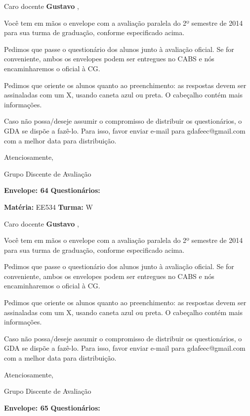 \documentclass[a5paper]{letter}
\begin{document}
Caro docente {\bf Gustavo }, 

	Você tem em mãos o envelope com a avaliação paralela do 2º semestre de 2014 para sua turma de graduação, conforme especificado acima.

	Pedimos que passe o questionário dos alunos junto à avaliação oficial. Se for conveniente, ambos os envelopes podem ser entregues no CABS e nós encaminharemos o oficial à CG.

Pedimos que oriente os alunos quanto ao preenchimento: as respostas devem ser assinaladas com um X, usando caneta azul ou preta. O cabeçalho contém mais informações.

	Caso não possa/deseje assumir o compromisso de distribuir os questionários, o GDA se dispõe a fazê-lo. Para isso, favor enviar e-mail para gdafeec@gmail.com com a melhor data para distribuição.


Atenciosamente, 

Grupo Discente de Avaliação

\vspace{0.5cm}

{\bf Envelope: 64 }		\hfill	{\bf Questionários:} \hspace{2cm}

\newpage
\thispagestyle{empty}

\hfill {\bf Matéria:} EE534 {\bf Turma:} W

Caro docente {\bf Gustavo }, 

	Você tem em mãos o envelope com a avaliação paralela do 2º semestre de 2014 para sua turma de graduação, conforme especificado acima.

	Pedimos que passe o questionário dos alunos junto à avaliação oficial. Se for conveniente, ambos os envelopes podem ser entregues no CABS e nós encaminharemos o oficial à CG.

Pedimos que oriente os alunos quanto ao preenchimento: as respostas devem ser assinaladas com um X, usando caneta azul ou preta. O cabeçalho contém mais informações.

	Caso não possa/deseje assumir o compromisso de distribuir os questionários, o GDA se dispõe a fazê-lo. Para isso, favor enviar e-mail para gdafeec@gmail.com com a melhor data para distribuição.


Atenciosamente, 

Grupo Discente de Avaliação

\vspace{0.5cm}

{\bf Envelope: 65 }		\hfill	{\bf Questionários:} \hspace{2cm}
\end{document}
